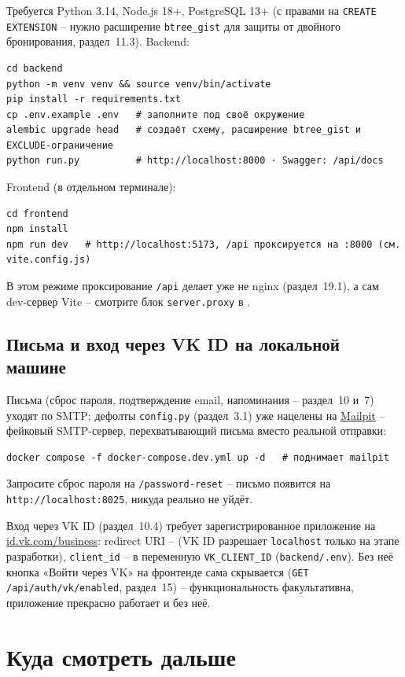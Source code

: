 Требуется Python 3.14, Node.js 18+, PostgreSQL 13+ (с правами на
\texttt{CREATE EXTENSION} -- нужно расширение \texttt{btree_gist} для
защиты от двойного бронирования, раздел~11.3). Backend:
\begin{verbatim}
cd backend
python -m venv venv && source venv/bin/activate
pip install -r requirements.txt
cp .env.example .env   # заполните под своё окружение
alembic upgrade head   # создаёт схему, расширение btree_gist и EXCLUDE-ограничение
python run.py          # http://localhost:8000 · Swagger: /api/docs
\end{verbatim}
Frontend (в отдельном терминале):
\begin{verbatim}
cd frontend
npm install
npm run dev   # http://localhost:5173, /api проксируется на :8000 (см. vite.config.js)
\end{verbatim}
В этом режиме проксирование \texttt{/api} делает уже не nginx (раздел~19.1),
а сам dev-сервер Vite -- смотрите блок \texttt{server.proxy} в
.

\subsection{Письма и вход через VK ID на локальной машине}

Письма (сброс пароля, подтверждение email, напоминания -- раздел~10 и~7)
уходят по SMTP; дефолты \texttt{config.py} (раздел~3.1) уже нацелены на
\href{https://github.com/axllent/mailpit}{Mailpit} -- фейковый
SMTP-сервер, перехватывающий письма вместо реальной отправки:
\begin{verbatim}
docker compose -f docker-compose.dev.yml up -d   # поднимает mailpit
\end{verbatim}
Запросите сброс пароля на \texttt{/password-reset} -- письмо появится на
\texttt{http://localhost:8025}, никуда реально не уйдёт.

Вход через VK ID (раздел~10.4) требует зарегистрированное приложение на
\href{https://id.vk.com/business}{id.vk.com/business}: redirect URI --
 (VK ID разрешает
\texttt{localhost} только на этапе разработки), \texttt{client_id} -- в
переменную \texttt{VK_CLIENT_ID} (\texttt{backend/.env}). Без неё
кнопка «Войти через VK» на фронтенде сама скрывается
(\texttt{GET /api/auth/vk/enabled}, раздел~15) -- функциональность
факультативна, приложение прекрасно работает и без неё.

\section{Куда смотреть дальше}

